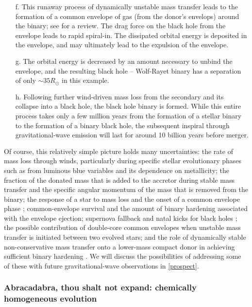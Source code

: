 \documentclass[iop,onecolumn]{revtex4}
\begin{document}
\begin{enumerate}
\item[f.] This runaway process of dynamically unstable mass transfer leads to the formation of a common envelope of gas (from the donor's envelops) around the binary; see \citet{Ivanova:2013} for a review.  The drag force on the black hole from the envelope leads to rapid spiral-in.   The dissipated orbital energy is deposited in the envelope, and may ultimately lead to the expulsion of the envelope.  
\item[g.] The orbital energy is decreased by an amount necessary to unbind the envelope, and the resulting black hole -- Wolf-Rayet binary has a separation of only $\sim 35 R_\odot$ in this example.  
\item[h.] Following further wind-driven mass loss from the secondary and its collapse into a black hole, the black hole binary is formed.  While this entire process takes only a few million years from the formation of a stellar binary to the formation of a binary black hole, the subsequent inspiral through gravitational-wave emission will last for around 10 billion years before merger.
\end{enumerate}

Of course, this relatively simple picture holds many uncertainties: the rate of mass loss through winds, particularly during specific stellar evolutionary phases such as from luminous blue variables \citep[massive supergiant stars with significant outbursts and eruptions and associated rapid mass loss,][]{Mennekens:2014}  and its dependence on metallicity; the fraction of the donated mass that is added to the accretor during stable mass transfer and the specific angular momentum of the mass that is removed from the binary; the response of a star to mass loss and the onset of a common envelope phase \citep{Pavlovskii:2017}; common-envelope survival and the amount of binary hardening associated with the envelope ejection; supernova fallback and natal kicks for black holes \citep[e.g.,][]{Repetto:2012,Mandel:2015kicks}; the possible contribution of double-core common envelopes when unstable mass transfer is initiated between two evolved stars; and the role of dynamically stable non-conservative mass transfer onto a lower-mass compact donor in achieving sufficient binary hardening  \citep{vandenHeuvel:2017,Neijssel:2018}.  We will discuss the possibilities of addressing some of these with future gravitational-wave observations in \autoref{prospect}.

\subsubsection{Abracadabra, thou shalt not expand: chemically homogeneous evolution}\label{sec:CHE}
\end{document}
